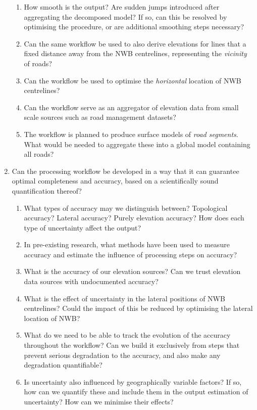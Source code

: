 \begin{enumerate}
\begin{enumerate}
        \item How smooth is the output? Are sudden jumps introduced after aggregating the decomposed model? If so, can this be resolved by optimising the procedure, or are additional smoothing steps necessary?
        \item Can the same workflow be used to also derive elevations for lines that a fixed distance away from the NWB centrelines, representing the \textit{vicinity} of roads?
        \item Can the workflow be used to optimise the \textit{horizontal} location of NWB centrelines?
        \item Can the workflow serve as an aggregator of elevation data from small scale sources such as road management datasets?
        \item The workflow is planned to produce surface models of \textit{road segments}. What would be needed to aggregate these into a global model containing all roads?
    \end{enumerate}
    \item Can the processing workflow be developed in a way that it can guarantee optimal completeness and accuracy, based on a scientifically sound quantification thereof?
    \begin{enumerate}
        \item What types of accuracy may we distinguish between? Topological accuracy? Lateral accuracy? Purely elevation accuracy? How does each type of uncertainty affect the output?
        \item In pre-existing research, what methods have been used to measure accuracy and estimate the influence of processing steps on accuracy?
        \item What is the accuracy of our elevation sources? Can we trust elevation data sources with undocumented accuracy?
        \item What is the effect of uncertainty in the lateral positions of NWB centrelines? Could the impact of this be reduced by optimising the lateral location of NWB?
        \item What do we need to be able to track the evolution of the accuracy throughout the workflow? Can we build it exclusively from steps that prevent serious degradation to the accuracy, and also make any degradation quantifiable?
        \item Is uncertainty also influenced by geographically variable factors? If so, how can we quantify these and include them in the output estimation of uncertainty? How can we minimise their effects?

\end{enumerate}
\end{enumerate}
